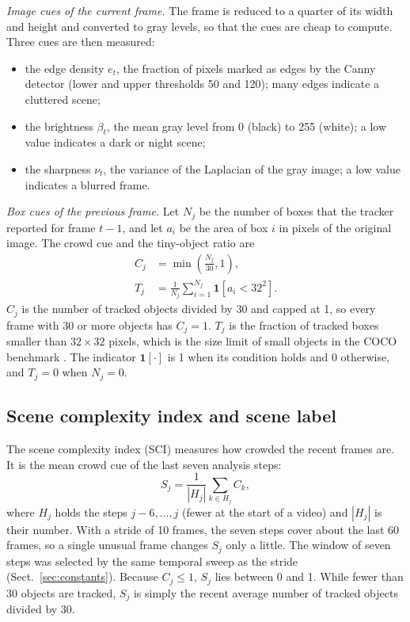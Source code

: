 \documentclass[pdflatex,sn-mathphys-num,iicol]{sn-jnl}
\begin{document}
\emph{Image cues of the current frame.} The frame is reduced to a quarter of
its width and height and converted to gray levels, so that the cues are cheap
to compute. Three cues are then measured:
\begin{itemize}
\item the edge density $e_t$, the fraction of pixels marked as edges by the
      Canny detector (lower and upper thresholds 50 and 120); many edges
      indicate a cluttered scene;
\item the brightness $\beta_t$, the mean gray level from 0 (black) to 255
      (white); a low value indicates a dark or night scene;
\item the sharpness $\nu_t$, the variance of the Laplacian of the gray image;
      a low value indicates a blurred frame.
\end{itemize}

\emph{Box cues of the previous frame.} Let $N_j$ be the number of boxes that
the tracker reported for frame $t-1$, and let $a_i$ be the area of box $i$ in
pixels of the original image. The crowd cue and the tiny-object ratio are
\begin{align}
C_j&=\min\!\left(\frac{N_j}{30},1\right),\label{eq:crowd}\\
T_j&=\frac{1}{N_j}\sum_{i=1}^{N_j}\mathbf{1}\!\left[a_i<32^2\right].\label{eq:tiny}
\end{align}
$C_j$ is the number of tracked objects divided by 30 and capped at 1, so every
frame with 30 or more objects has $C_j=1$. $T_j$ is the fraction of tracked
boxes smaller than $32\times32$ pixels, which is the size limit of small
objects in the COCO benchmark \cite{lin2014coco}. The indicator
$\mathbf{1}[\cdot]$ is 1 when its condition holds and 0 otherwise, and $T_j=0$
when $N_j=0$.

\subsection{Scene complexity index and scene label}
The scene complexity index (SCI) measures how crowded the recent frames are.
It is the mean crowd cue of the last seven analysis steps:
\begin{equation}
S_j=\frac{1}{|H_j|}\sum_{k\in H_j} C_k,
\label{eq:sci}
\end{equation}
where $H_j$ holds the steps $j-6,\dots,j$ (fewer at the start of a video) and
$|H_j|$ is their number. With a stride of 10 frames, the seven steps cover
about the last 60 frames, so a single unusual frame changes $S_j$ only a little. The
window of seven steps was selected by the same temporal sweep as the stride
(Sect.~\ref{sec:constants}). Because $C_j\le1$, $S_j$ lies between 0 and 1.
While fewer than 30 objects are tracked, $S_j$ is simply the recent average
number of tracked objects divided by 30.
\end{document}

